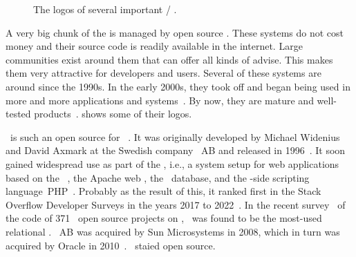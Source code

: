 \begin{figure}%
\centering%
\begin{noglslink}
%
%
%
\floatSep%
%
%
%
\floatSep%
%
%
%
\floatRowSep%
%
%
%
\caption{The logos of several important  / .}%
\label{fig:ossDBlogos}%
\end{noglslink}%
\end{figure}%
%
A very big chunk of the  is managed by open source .
These systems do not cost money and their source code is readily available in the internet.
Large communities exist around them that can offer all kinds of advise.
This makes them very attractive for developers and users.
Several of these systems are around since the 1990s.
In the early 2000s, they took off and began being used in more and more applications and systems~\cite{P2004OSDMITM}.
By now, they are mature and well-tested products~\cite{C20245YOQ}.
 shows some of their logos.

\mysql\ is such an open source  for ~\cite{WAM2002MRMDFTS,TA2024DDAMWPAM,BT2021HPM,RGS2021BTOTONAMDFPC,D2015LMAM}.
It was originally developed by Michael Widenius and David Axmark at the Swedish company \mysql~AB and released in 1996~\cite{C20245YOQ}.
It soon gained widespread use as part of the \lampStack, i.e., a system setup for web applications based on the \linux\ , the Apache web , the \mysql\ database, and the -side scripting language~PHP~\cite{C2022HAFTLS,H2020ULU2E}.
Probably as the result of this, it ranked first in the Stack Overflow Developer Surveys in the years 2017 to 2022~\cite{SE:SO:2024DS}.
In the recent survey~\cite{PMPVEPWGSMB2025ATAODMSTTHOOSP} of the code of 371~ open source projects on \github, \mysql\ was found to be the most-used relational .
\mysql~AB was acquired by Sun Microsystems in 2008, which in turn was acquired by Oracle in 2010~\cite{C20245YOQ}.
\mysql\ staied open source.

